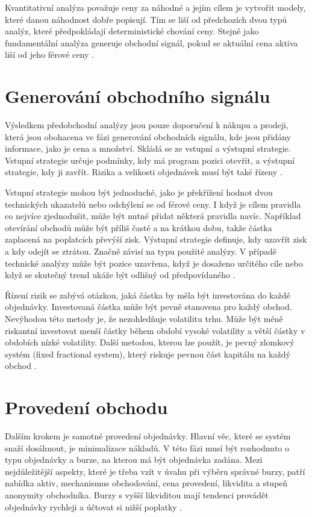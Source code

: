 Kvantitativní analýza považuje ceny za náhodné a jejím cílem je vytvořit modely, které danou náhodnost dobře popisují.
Tím se liší od předchozích dvou typů analýz, které předpokládají deterministické chování ceny.
Stejně jako fundamentální analýza generuje obchodní signál, pokud se aktuální cena aktiva liší od jeho férové ceny \cite{nuti}.

\section{Generování obchodního signálu}
Výsledkem předobchodní analýzy jsou pouze doporučení k nákupu a prodeji, která jsou obohacena ve fázi generování obchodních signálu, kde jsou přidány informace, jako je cena a množství.
Skládá se ze vstupní a výstupní strategie.
Vstupní strategie určuje podmínky, kdy má program pozici otevřít, a výstupní strategie, kdy ji zavřít.
Rizika a velikosti objednávek musí být také řízeny \cite{nuti}.

Vstupní strategie mohou být jednoduché, jako je překřížení hodnot dvou technických ukazatelů nebo odchýlení se od férové ceny.
I když je cílem pravidla co nejvíce zjednodušit, může být nutné přidat některá pravidla navíc.
Například otevírání obchodů může být příliš časté a na krátkou dobu, takže částka zaplacená na poplatcích převýší zisk.
Výstupní strategie definuje, kdy uzavřít zisk a kdy odejít se ztrátou.
Značně závisí na typu použité analýzy.
V případě technické analýzy může být pozice uzavřena, když je dosaženo určitého cíle nebo když se skutečný trend ukáže být odlišný od předpovídaného \cite{nuti}.

Řízení rizik se zabývá otázkou, jaká částka by měla být investována do každé objednávky.
Investovaná částka může být pevně stanovena pro každý obchod.
Nevýhodou této metody je, že nezohledňuje volatilitu trhu.
Může být méně riskantní investovat menší částky během období vysoké volatility a větší částky v obdobích nízké volatility.
Další metodou, kterou lze použít, je pevný zlomkový systém (fixed fractional system), který riskuje pevnou část kapitálu na každý obchod \cite{nuti}.

\section{Provedení obchodu}
Dalším krokem je samotné provedení objednávky.
Hlavní věc, které se systém snaží dosáhnout, je minimalizace nákladů.
V této fázi musí být rozhodnuto o typu objednávky a burze, na kterou má být objednávka zadána.
Mezi nejdůležitější aspekty, které je třeba vzít v úvahu při výběru správné burzy, patří nabídka aktiv, mechanismus obchodování, cena provedení, likvidita a stupeň anonymity obchodníka.
Burzy s vyšší likviditou mají tendenci provádět objednávky rychleji a účtovat si nižší poplatky \cite{nuti}.

